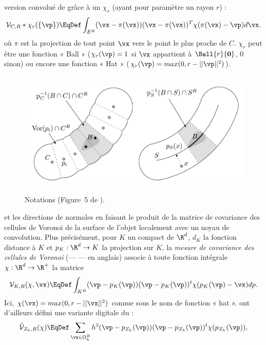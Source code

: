 version convolué de \VCM grâce à un  $\chi_r$
(ayant pour paramètre un rayon $r$) :
%
\begin{equation}
  \mathcal{V}_{C,R} \ast \chi_r(\{\vp\}) \EqDef \int_{E^R} (\vx - \pi(\vx))(\vx - \pi(\vx))^T \chi(\pi(\vx) - \vp) d\vx .
\end{equation}
%
où $\pi$ est la projection de tout point $\vx$ vers le point le plus proche de
$C$. $\chi_r$ peut être une fonction « Ball » ($\chi_r(\vp) = 1$ si $\vx$
appartient à $\Ball{r}{\mathbf{0}}$, $0$ sinon) ou encore une fonction « Hat »
($\chi_r(\vp) = max(0, r - ||\vp||^2)$).
%
%
\begin{figure}[ht]{
    \begin{center}
    \includegraphics[height=6cm]{images/Feature/VCM_notations}
    \end{center}}
    \caption[Notations.]{Notations (Figure~5 de \cite{Merigot2011}).
      \label{fig:mellado-multiscale}}
\end{figure}
%
%

 et les directions de normales en faisant le produit de la matrice de
covariance des cellules de Voronoi de la surface de l'objet localement avec un
noyau de convolution.
%
Plus précisément, pour $K$ un compact de $\R^d$, $d_K$ la fonction distance à
$K$ et $p_K : \R^d \rightarrow K$ la projection sur $K$, la \emph{mesure de
covariance des cellules de Voronoi} (\VCMM --- \VCM --- en anglais) associe à toute
fonction intégrale $\chi : \R^d \rightarrow \R^+$ la matrice
%
\begin{equation}
  \mathcal{V}_{K,R}(\chi, \vx) \EqDef \int_{K^R} (\vp - p_K(\vp)) (\vp - p_K(\vp))^t \chi(p_K(\vp) - \vx)dp .
\end{equation}
%
Ici, $\chi(\vx) = max(0, r - ||\vx||^2)$ connue sous le nom de fonction « hat ».
%
 ont d'ailleurs défini une variante digitale du
\VCM :
%
\begin{equation}
  \hat{\mathcal{V}}_{Z_h,R}(\chi) \EqDef \sum_{\vx \in \Omega_h^R} h^3 (\vp - p_{Z_h}(\vp)) (\vp - p_{Z_h}(\vp))^t \chi(p_{Z_h}(\vp)) ,
\end{equation}

